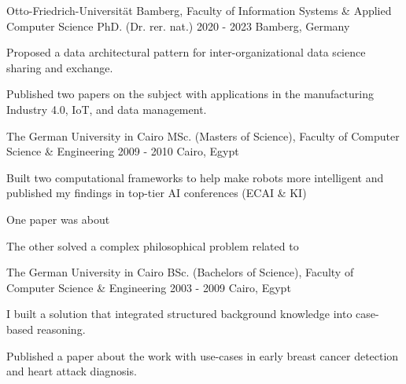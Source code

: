 \begin{cventries}



  \cventry
    {Otto-Friedrich-Universit\"{a}t Bamberg, Faculty of Information Systems \& Applied Computer Science}  %
    {PhD. (Dr. rer. nat.)} %
    {2020 - 2023} %
    {Bamberg, Germany} %
    {	
      \begin{cvitems} %
		\item {Proposed a data architectural pattern for inter-organizational data science sharing and exchange.}
		\item {Published two papers on the subject with applications in the manufacturing Industry 4.0, IoT, and data management.}
    \end{cvitems}
    }
    
\vspace{4ex}


  \cventry
    {The German University in Cairo}  %
    {MSc. (Masters of Science), Faculty of Computer Science \& Engineering} %
    {2009 - 2010} %
    {Cairo, Egypt} %
    {	
      \begin{cvitems} %
		\item {Built two computational frameworks to help make robots more intelligent and published my findings in top-tier AI conferences (ECAI \& KI)}
		\item {One paper was about }
		\item {The other solved a complex philosophical problem related to }
    \end{cvitems}
    }
    
    
\vspace{4ex}



  \cventry
    {The German University in Cairo}  %
    {BSc. (Bachelors of Science), Faculty of Computer Science \& Engineering} %
    {2003 - 2009} %
    {Cairo, Egypt} %
    {	
      \begin{cvitems} %
		\item {I built a solution that integrated structured background knowledge into case-based reasoning.}
		\item {Published a paper about the work with use-cases in early breast cancer detection and heart attack diagnosis.}
    \end{cvitems}
    }
    

\end{cventries}
